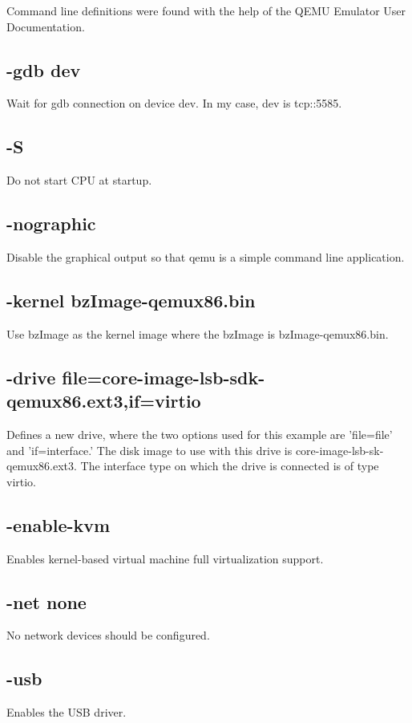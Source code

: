 \documentclass[letterpaper,
10pt, titlepage, draftclsnofoot, onecolumn]{IEEEtran}
\begin{document}
Command line definitions were found with the help of the QEMU Emulator User Documentation. \cite{QEMU}

\subsection*{-gdb dev}
Wait for gdb connection on device dev. In my case, dev is tcp::5585.

\subsection*{-S}
Do not start CPU at startup.

\subsection*{-nographic}
Disable the graphical output so that qemu is a simple command line application.

\subsection*{-kernel bzImage-qemux86.bin}
Use bzImage as the kernel image where the bzImage is bzImage-qemux86.bin.

\subsection*{-drive file=core-image-lsb-sdk-qemux86.ext3,if=virtio}
Defines a new drive, where the two options used for this example are 'file=file' and 'if=interface.' The disk image to use with this drive is core-image-lsb-sk-qemux86.ext3. The interface type on which the drive is connected is of type virtio.

\subsection*{-enable-kvm}
Enables kernel-based virtual machine full virtualization support.

\subsection*{-net none}
No network devices should be configured.

\subsection*{-usb}
Enables the USB driver.
\end{document}

